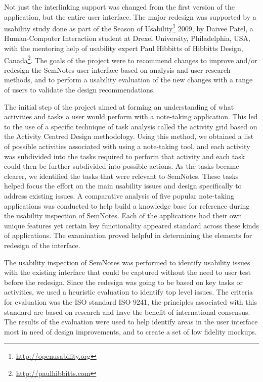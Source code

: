 Not just the interlinking support was changed from the first version of the application, but the entire user interface. The major redesign was supported by a usability study done as part of the Season of Usability\footnote{\url{http://openusability.org}} 2009, by Daivee Patel, a Human-Computer Interaction student at Drexel University, Philadelphia, USA, with the mentoring help of usability expert Paul Hibbitts of Hibbitts Design, Canada\footnote{\url{http://paulhibbitts.com}}. 
The goals of the project were to recommend changes to improve and/or redesign the SemNotes user interface based on analysis and user research methods, and to perform a usability evaluation of the new changes with a range of users to validate the design recommendations. 

The initial step of the project aimed at forming an understanding of what activities and tasks a user would perform with a note-taking application. This led to the use of a specific technique of task analysis called the activity grid based on the Activity Centred Design methodology. Using this method, we obtained a list of possible activities associated with using a note-taking tool, and each activity was subdivided into the tasks required to perform that activity and each task could then be further subdivided into possible actions. As the tasks became clearer, we identified the tasks that were relevant to SemNotes. These tasks helped focus the effort on the main usability issues and design specifically to address existing issues. 
A comparative analysis of five popular note-taking applications was conducted to help build a knowledge base for reference during the usability inspection of SemNotes. Each of the applications had their own unique features yet certain key functionality appeared standard across these kinds of applications. The examination proved helpful in determining the elements for redesign of the interface. 

The usability inspection of SemNotes was performed to identify usability issues with the existing interface that could be captured without the need to user test before the redesign.
Since the redesign was going to be based on key tasks or activities, we used a heuristic evaluation to identify top level issues.
The criteria for evaluation was the ISO standard ISO 9241\cite{ISO9241}, the principles associated with this standard are based on research and have the benefit of international consensus.
The results of the evaluation were used to help identify areas in the user interface most in need of design improvements, and to create a set of low fidelity mockups. 

